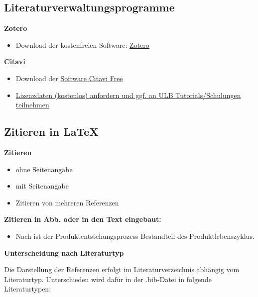 \subsection{Literaturverwaltungsprogramme}
\begin{sloppypar}
\textbf{Zotero}
    \begin{itemize}
        \item Download der kostenfreien Software: \href{https://www.zotero.org/}{Zotero}
    \end{itemize}
    
\textbf{Citavi}
    \begin{itemize}
        \item Download der \href{https://www.ulb.tu-darmstadt.de/service/literaturverwaltung_start/citavi_ulb/citavi_ulb.de.jsp}{Software Citavi Free}
        
        \item \href{https://citaviweb.citavi.com/p/campus?signin=381c6aa567651c63bf9c923be02b4568&accountKey=r52j8qr0an1djhf7njobe6ry4svyc8sapuuboul020lh8xt3#usertype}{Lizenzdaten (kostenlos) anfordern und ggf. an ULB Tutorials/Schulungen teilnehmen}
    \end{itemize}
\end{sloppypar}

\clearpage

\subsection{Zitieren in LaTeX}
\label{subsec:ZitLaTeX}

\textbf{Zitieren}
\begin{itemize}
    \item ohne Seitenangabe \cite{anderl_simulations}
    \item mit Seitenangabe \cite[3-12]{anderl_simulations}
    \item Zitieren von mehreren Referenzen \cite{anderl_simulations, DissHaag}
\end{itemize}

\textbf{Zitieren in Abb. oder in den Text eingebaut:}
\begin{itemize}
    \item Nach \textcite{anderl_virtuelle_2020} ist der Produktentstehungsprozess Bestandteil des Produktlebenszyklus.
\end{itemize}

\textbf{Unterscheidung nach Literaturtyp}

Die Darstellung der Referenzen erfolgt im Literaturverzeichnis abhängig vom Literaturtyp.
Unterschieden wird dafür in der .bib-Datei in folgende Literaturtypen:


